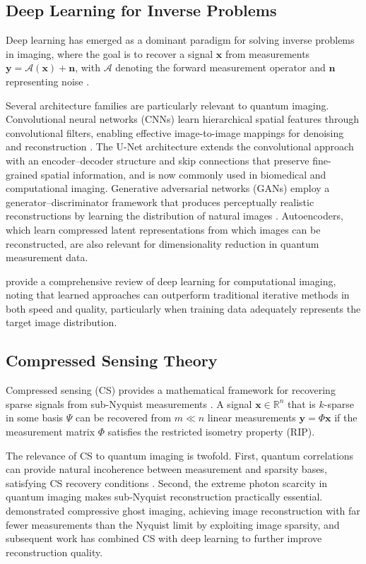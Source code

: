 \subsection{Deep Learning for Inverse Problems}

Deep learning has emerged as a dominant paradigm for solving inverse problems in imaging, where the goal is to recover a signal $\mathbf{x}$ from measurements $\mathbf{y} = \mathcal{A}(\mathbf{x}) + \mathbf{n}$, with $\mathcal{A}$ denoting the forward measurement operator and $\mathbf{n}$ representing noise \citep{barbastathis2019}.

Several architecture families are particularly relevant to quantum imaging. Convolutional neural networks (CNNs) learn hierarchical spatial features through convolutional filters, enabling effective image-to-image mappings for denoising and reconstruction \citep{lecun2015}. The U-Net architecture \citep{ronneberger2015} extends the convolutional approach with an encoder--decoder structure and skip connections that preserve fine-grained spatial information, and is now commonly used in biomedical and computational imaging. Generative adversarial networks (GANs) employ a generator--discriminator framework that produces perceptually realistic reconstructions by learning the distribution of natural images \citep{goodfellow2014}. Autoencoders, which learn compressed latent representations from which images can be reconstructed, are also relevant for dimensionality reduction in quantum measurement data.

\citet{barbastathis2019} provide a comprehensive review of deep learning for computational imaging, noting that learned approaches can outperform traditional iterative methods in both speed and quality, particularly when training data adequately represents the target image distribution.

\subsection{Compressed Sensing Theory}

Compressed sensing (CS) provides a mathematical framework for recovering sparse signals from sub-Nyquist measurements \citep{donoho2006, candes2006}. A signal $\mathbf{x} \in \mathbb{R}^n$ that is $k$-sparse in some basis $\Psi$ can be recovered from $m \ll n$ linear measurements $\mathbf{y} = \Phi \mathbf{x}$ if the measurement matrix $\Phi$ satisfies the restricted isometry property (RIP).

The relevance of CS to quantum imaging is twofold. First, quantum correlations can provide natural incoherence between measurement and sparsity bases, satisfying CS recovery conditions \citep{katz2009}. Second, the extreme photon scarcity in quantum imaging makes sub-Nyquist reconstruction practically essential. \citet{katz2009} demonstrated compressive ghost imaging, achieving image reconstruction with far fewer measurements than the Nyquist limit by exploiting image sparsity, and subsequent work has combined CS with deep learning to further improve reconstruction quality.
